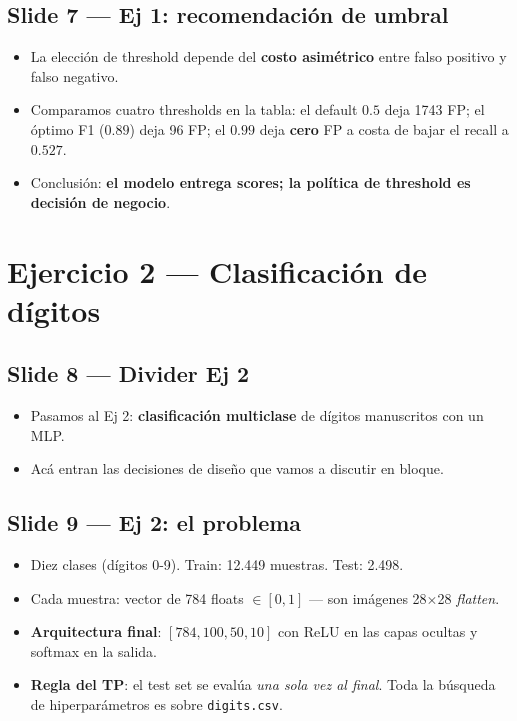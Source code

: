 \documentclass[11pt,a4paper]{article}
\begin{document}
\subsection{Slide 7 — Ej 1: recomendación de umbral}

\begin{decir}
\begin{itemize}[leftmargin=*,topsep=0pt]
  \item La elección de threshold depende del \textbf{costo asimétrico} entre falso
        positivo y falso negativo.
  \item Comparamos cuatro thresholds en la tabla: el default $0.5$ deja 1743 FP;
        el óptimo F1 ($0.89$) deja 96 FP; el $0.99$ deja \textbf{cero} FP a costa
        de bajar el recall a $0.527$.
  \item Conclusión: \textbf{el modelo entrega scores; la política de threshold es
        decisión de negocio}.
\end{itemize}
\end{decir}

\section{Ejercicio 2 — Clasificación de dígitos}

\subsection{Slide 8 — Divider Ej 2}

\begin{decir}
\begin{itemize}[leftmargin=*,topsep=0pt]
  \item Pasamos al Ej 2: \textbf{clasificación multiclase} de dígitos manuscritos
        con un MLP.
  \item Acá entran las decisiones de diseño que vamos a discutir en bloque.
\end{itemize}
\end{decir}

\subsection{Slide 9 — Ej 2: el problema}

\begin{decir}
\begin{itemize}[leftmargin=*,topsep=0pt]
  \item Diez clases (dígitos 0-9). Train: 12.449 muestras. Test: 2.498.
  \item Cada muestra: vector de 784 floats $\in [0,1]$ — son imágenes 28$\times$28
        \emph{flatten}.
  \item \textbf{Arquitectura final}: $[784, 100, 50, 10]$ con ReLU en las capas
        ocultas y softmax en la salida.
  \item \textbf{Regla del TP}: el test set se evalúa \emph{una sola vez al final}.
        Toda la búsqueda de hiperparámetros es sobre \texttt{digits.csv}.
\end{itemize}
\end{decir}
\end{document}
